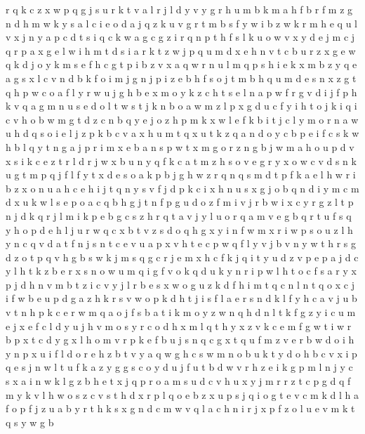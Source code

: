 \documentclass{article}
\begin{document}
r q k
c z x w p q g j s u r k t v a l
r j l d y v
y g r h u m b k
m a h f
b r f m z g n d
h m w k y s a
l c i e o d a j q z k u v g r t m b s f y w
i b z w k r m h e q u l v x j n y a p c d t
s i q c k w a g
c g z i r q n p t h f s l k u o w v x y d e j m
c j q r p a x g e l w i h m t d s
i a r k t z w j p q u m d x e h n v
t c b u r z x g e w q k
d j o y k m s e f h c g t p i b z v x a q w r n u l
m
q p s h i e k x m b z
y q e a g s x l c v n d b k f o i m j
g n j p i z e b h f s
o j t m b h q
u m d e s n x z g t q h p w c o a f l y r
w u j g h b e x
m o y k z c h t s e l n a p w f r g v d i j
f p h k v q a g m n u s e d o l t w
s t j k n b o a w m z l p x g d u c f y i h
t o j k i
q i c v h o b w m g t d z
c n b q y e j o z h p m k x w l
e f k b i t j c l y m o r n a w u h d q s
o i e l j z p k b c v a x h u m t q
x u t k z q a n d o y c b p e i
f c s k w h b l q y t n g a j p r i m x e
b a n s p w t x m g o r z
n g b j w m a h o u p d v x s i k c e z t r l
d r j w x b u n y q f k c a t m z h s o v e g
r y x o w c v d s n k u g t m p q j f l
f y t x d e s o a k p b j g h w z r q n
q s m d t p f k a e l h w r i b z x o n u
a h c
e h i j t q n y
s v f j d p k c i x h n u
s x g j o b q n d i y m c
m
d x u k w l s e p o a c q b h g j t n f
p g u d o z f m i v j r
b w i x c y r g z l t p n j d k
q r j l
m i k p e b g c s z h r q t a v j y l u o
r q a m v e
g b q r
t u f s q y h
o p d e h l j u r w q c x b
t v z s d o q h g x y i n f w
m x r i w p s o u z l h y n c q v d a t
f n j
s n t c e v u a p
x v h t e c p
w q f l y v j
b v n y w t h r s g d
z o t p q v h g b s w k j m
s q g c r j e m x
h c f k j q i t y u d z v p e
p a j d c y l h t k z b e r x s n o w u m q i g f v
o k
q d u k y n r i p w l h t o c
f s a r y x p j d h n v m b t z i c
v y j l r b e s x w o g u z k d f h i m t q c n
l n t q o x c j i f w b e u p d g a z h k r s v
w o p k d h t j i s f l a e r
s
n d k l f y h c a v j u b
v t n h p k c e r w m q a o j f s
b a t i k m o y z w n q h d
n l t k f g z y i c u m e j
x e f c l d y u j h v m o
s y r c o d h x m l
q t h y x z
v k c e m f g w t
i w r b p x
t c d y g x l h o m v r p k e f b u j s n q
c g x t q u f m z v e r b w d o i h y n
p x u i f l d o r e h z b t v y a q w g
h c s w m n o b u k t y
d o h b c v x i p q e s j n w l t u f k a z y g
g s c o y d u j
f u t b d w v r h z e i k g p m l n j y c s x a
i n w k l g z b h e t x j q p r o a m s u d c v
h u x y j m r
r z t c p g d q f m y k v l h w o s
z c v s t h d x r p l q o e
b z x u p s j q i o g t e v c m k d l h a f
o p f j z u a b y r t h k s x g n d c m w v q l
a c h n i r j x p f z o l u e v m k t q s y w g b
\end{document}
